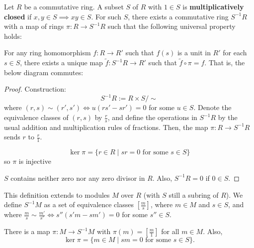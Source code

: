 \begin{defn}
    Let $R$ be a commutative ring. A subset $S$ of $R$ with $1 \in S$ is \textbf{multiplicatively closed} if $x,y \in S \implies xy \in S$. For such $S$, there exists a commutative ring $S^{-1}R$ with a map of rings $\pi : R \to S^{-1}R$ such that the following universal property holds:

    For any ring homomorphism $f : R \to R'$ such that $f(s)$ is a unit in $R'$ for each $s \in S$, there exists a unique map $\tilde f:S^{-1}R \to R'$ such that $\tilde f \circ \pi = f$. That is, the below diagram commutes:

\end{defn}

\begin{proof}
    Construction:
    $$S^{-1}R:= R \times S/ \sim$$
    where $(r,s) \sim (r',s') \iff u(rs'-sr')=0$ for some $u \in S$. Denote the equivalence classes of $(r,s)$ by $\frac{r}{s}$, and define the operations in $S^{-1}R$ by the usual addition and multiplication rules of fractions. Then, the map $\pi :R \to S^{-1}R$ sends $r$ to $\frac{r}{1}$.

    \begin{rmk}
        $$\ker \pi = \{ r \in R \mid sr =0\text{ for some } s \in S\}$$
        so $\pi$ is injective
    \end{rmk}
    $S$ contains neither zero nor any zero divisor in $R$. Also, $S^{-1}R=0$ if $0 \in S$.
\end{proof}

\begin{defn}
    This definition extends to modules $M$ over $R$ (with $S$ still a subring of $R$). We define $S^{-1}M$ as a set of equivalence classes $[\frac{m}{s}]$, where $m \in M$ and $s \in S$, and where $\frac{m}{s} \sim \frac{m'}{s'} \iff s'' (s'm-sm')=0$ for some $s'' \in S$.
\end{defn}

\begin{rmk}
    There is a map $\pi :M \to S^{-1}M$ with $\pi (m) = [\frac{m}{1}]$ for all $m \in M$. Also,
    $$\ker \pi = \{ m \in M \mid sm =0 \text{ for some } s \in S\}.$$
\end{rmk}

